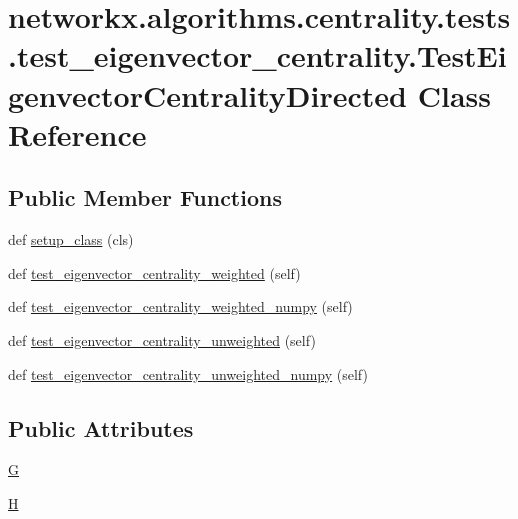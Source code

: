 \hypertarget{classnetworkx_1_1algorithms_1_1centrality_1_1tests_1_1test__eigenvector__centrality_1_1TestEigenvectorCentralityDirected}{}\section{networkx.\+algorithms.\+centrality.\+tests.\+test\+\_\+eigenvector\+\_\+centrality.\+Test\+Eigenvector\+Centrality\+Directed Class Reference}
\label{classnetworkx_1_1algorithms_1_1centrality_1_1tests_1_1test__eigenvector__centrality_1_1TestEigenvectorCentralityDirected}
\subsection*{Public Member Functions}
\begin{DoxyCompactItemize}
\item 
def \hyperlink{classnetworkx_1_1algorithms_1_1centrality_1_1tests_1_1test__eigenvector__centrality_1_1TestEigenvectorCentralityDirected_a19f9529c02ae4ec257aa95789d30b460}{setup\+\_\+class} (cls)
\item 
def \hyperlink{classnetworkx_1_1algorithms_1_1centrality_1_1tests_1_1test__eigenvector__centrality_1_1TestEigenvectorCentralityDirected_afbbaf260aa2935a5d8f9ac54b8900cf9}{test\+\_\+eigenvector\+\_\+centrality\+\_\+weighted} (self)
\item 
def \hyperlink{classnetworkx_1_1algorithms_1_1centrality_1_1tests_1_1test__eigenvector__centrality_1_1TestEigenvectorCentralityDirected_a688fd2fe90240835a4c2f25270390af5}{test\+\_\+eigenvector\+\_\+centrality\+\_\+weighted\+\_\+numpy} (self)
\item 
def \hyperlink{classnetworkx_1_1algorithms_1_1centrality_1_1tests_1_1test__eigenvector__centrality_1_1TestEigenvectorCentralityDirected_aae2e2445df79e2397cceabca186cc8a7}{test\+\_\+eigenvector\+\_\+centrality\+\_\+unweighted} (self)
\item 
def \hyperlink{classnetworkx_1_1algorithms_1_1centrality_1_1tests_1_1test__eigenvector__centrality_1_1TestEigenvectorCentralityDirected_a9ceabb63855fc0a0906c3d8932b77800}{test\+\_\+eigenvector\+\_\+centrality\+\_\+unweighted\+\_\+numpy} (self)
\end{DoxyCompactItemize}
\subsection*{Public Attributes}
\begin{DoxyCompactItemize}
\item 
\hyperlink{classnetworkx_1_1algorithms_1_1centrality_1_1tests_1_1test__eigenvector__centrality_1_1TestEigenvectorCentralityDirected_a29f9dcf44b0330da7d8419122b95749f}{G}
\item 
\hyperlink{classnetworkx_1_1algorithms_1_1centrality_1_1tests_1_1test__eigenvector__centrality_1_1TestEigenvectorCentralityDirected_a8c26b85c503f5322a7ad45575ec9c7ac}{H}
\end{DoxyCompactItemize}


